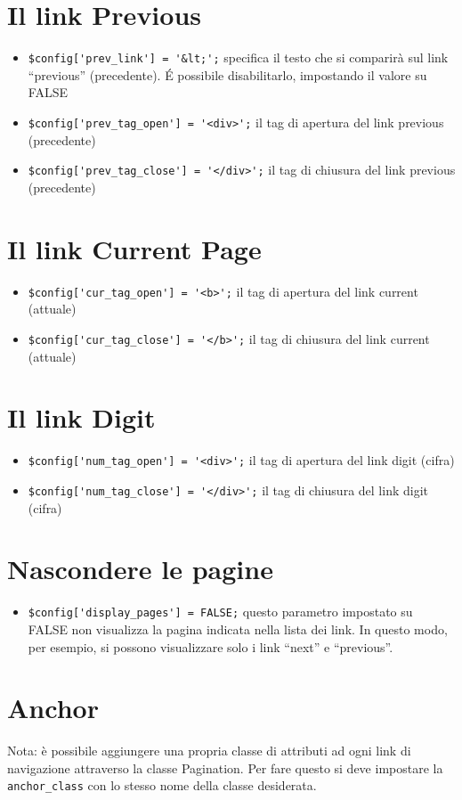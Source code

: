 \section*{Il link Previous}

\begin{itemize}
\item \verb|$config['prev_link'] = '&lt;';| specifica il testo che si comparirà  sul link ``previous'' (precedente). \'E possibile disabilitarlo, impostando il valore su FALSE
\item \verb|$config['prev_tag_open'] = '<div>';| il tag di apertura del link previous (precedente)
\item \verb|$config['prev_tag_close'] = '</div>';| il tag di chiusura del link previous (precedente)
\end{itemize}

\section*{Il link Current Page}
\begin{itemize}
\item \verb|$config['cur_tag_open'] = '<b>';| il tag di apertura del link current (attuale)
\item \verb|$config['cur_tag_close'] = '</b>';| il tag di chiusura del link current (attuale)
\end{itemize}

\section*{Il link Digit}
\begin{itemize}
\item \verb|$config['num_tag_open'] = '<div>';| il tag di apertura del link digit (cifra)
\item \verb|$config['num_tag_close'] = '</div>';| il tag di chiusura del link digit (cifra)
\end{itemize}

\section*{Nascondere le pagine}
\begin{itemize}
\item \verb|$config['display_pages'] = FALSE;| questo parametro impostato su FALSE non visualizza la pagina indicata nella lista dei link. In questo modo, per esempio, si possono visualizzare solo i link ``next'' e ``previous''.
\end{itemize}

\section*{Anchor}
Nota: è possibile aggiungere una propria classe di attributi ad ogni link di navigazione attraverso la classe Pagination. Per fare questo si deve impostare la \verb|anchor_class| con lo stesso nome della classe desiderata.